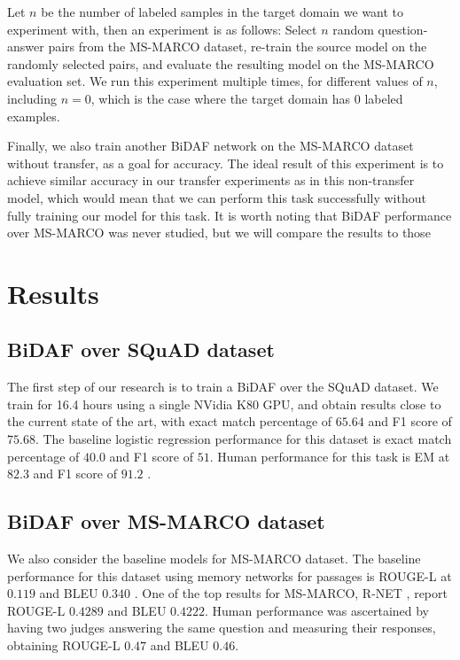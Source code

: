 \documentclass[11pt,a4paper]{article}
\begin{document}
Let $n$ be the number of labeled samples in the target domain we want to experiment with, then an experiment is as follows: Select $n$ random question-answer pairs from the MS-MARCO dataset, re-train the source model on the randomly selected pairs, and evaluate the resulting model on the MS-MARCO evaluation set. We run this experiment multiple times, for different values of $n$, including $n=0$, which is the case where the target domain has $0$ labeled examples. 

Finally, we also train another BiDAF network on the MS-MARCO dataset without transfer, as a goal for accuracy. The ideal result of this experiment is to achieve similar accuracy in our transfer experiments as in this non-transfer model, which would mean that we can perform this task successfully without fully training our model for this task. It is worth noting that BiDAF performance over MS-MARCO was never studied, but we will compare the results to those 

\section{Results}
\label{sec:results}

\subsection{BiDAF over SQuAD dataset}

The first step of our research is to train a BiDAF over the SQuAD dataset. We train for 16.4 hours using a single NVidia K80 GPU, and obtain results close to the current state of the art, with exact match percentage of $65.64$ and F1 score of $75.68$. The baseline logistic regression performance for this dataset is exact match percentage of $40.0$ and F1 score of $51$. Human performance for this task is EM at $82.3$ and F1 score of $91.2$ \cite{squad:2016} \cite{rnet}.

\subsection{BiDAF over MS-MARCO dataset}

We also consider the baseline models for MS-MARCO dataset. The baseline performance for this dataset using memory networks for passages is ROUGE-L at $0.119$ and BLEU $0.340$ \cite{msmarco:2016}. One of the top results for MS-MARCO, R-NET \cite{rnet}, report ROUGE-L $0.4289$ and BLEU $0.4222$. Human performance was ascertained by having two judges answering the same question and measuring their responses, obtaining ROUGE-L $0.47$ and BLEU $0.46$.
\end{document}
